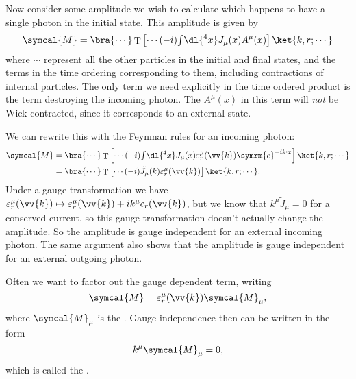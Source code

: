 \documentclass[fleqn]{NotesClass}
\newcommand{\e}{\symrm{e}}
\DeclareMathOperator{\timeOrdering}{T}
\newcommand{\amplitude}{\symcal{M}}
\begin{document}
    Now consider some amplitude we wish to calculate which happens to have a single photon in the initial state.
    This amplitude is given by
    \begin{equation}
        \amplitude = \bra{\cdots} \timeOrdering\left[ \cdots (-i){\textstyle \int} \dl{^4x} J_\mu(x) A^\mu(x) \right] \ket{k, r; \cdots}
    \end{equation}
    where \(\cdots\) represent all the other particles in the initial and final states, and the terms in the time ordering corresponding to them, including contractions of internal particles.
    The only term we need explicitly in the time ordered product is the term destroying the incoming photon.
    The \(A^\mu(x)\) in this term will \emph{not} be Wick contracted, since it corresponds to an external state.
    
    We can rewrite this with the Feynman rules for an incoming photon:
    \begin{align}
        \amplitude &= \bra{\cdots} \timeOrdering\left[ \cdots (-i){\textstyle \int} \dl{^4x} J_\mu(x) \varepsilon_r^\mu(\vv{k}) \e^{-i k \cdot x} \right] \ket{k, r; \cdots}\\
        &= \bra{\cdots} \timeOrdering\left[ \cdots (-i) \tilde{J}_\mu(k) \varepsilon_r^\mu(\vv{k}) \right] \ket{k, r; \cdots}.
    \end{align}
    Under a gauge transformation we have \(\varepsilon_r^\mu(\vv{k}) \mapsto \varepsilon_r^\mu(\vv{k}) + ik^\mu c_r(\vv{k})\), but we know that \(k^\mu \tilde{J}_\mu = 0\) for a conserved current, so this gauge transformation doesn't actually change the amplitude.
    So the amplitude is gauge independent for an external incoming photon.
    The same argument also shows that the amplitude is gauge independent for an external outgoing photon.
    
    Often we want to factor out the gauge dependent term, writing
    \begin{equation}
        \amplitude = \varepsilon_r^\mu(\vv{k}) \amplitude_\mu,
    \end{equation}
    where \(\amplitude_\mu\) is the .
    Gauge independence then can be written in the form
    \begin{equation}
        k^\mu \amplitude_\mu = 0,
    \end{equation}
    which is called the .
    
\end{document}
